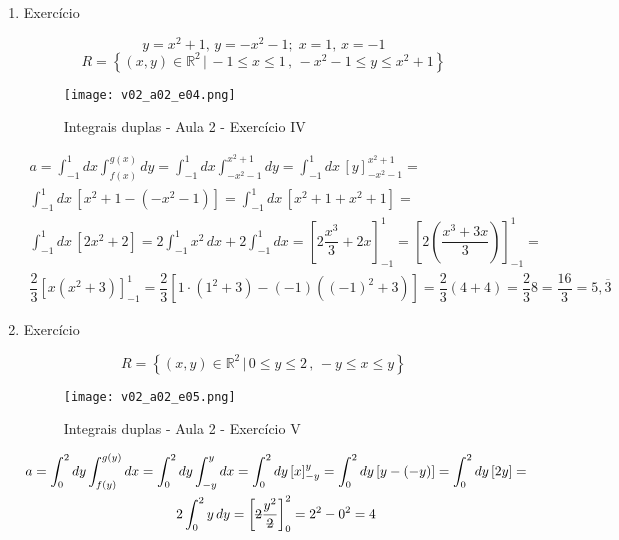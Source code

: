 \begin{enumerate}
	\item Exercício
	
	\begin{equation*}
		y = x^2 + 1 ,\, y = -x^2 - 1 ;\; x = 1 ,\, x = -1
	\end{equation*}
	\begin{equation*}
		R = \left\{(x, y) \in \mathbb{R}^2 \,|\, -1 \leq x \leq 1 \,,\, -x^2 - 1 \leq y \leq x^2 + 1 \right\}
	\end{equation*}	
	\begin{figure}[htb]
		\caption{Integrais duplas - Aula 2 - Exercício IV}
		\label{v02_a02_e04}
		\centering
		\texttt{[image: v02\_a02\_e04.png]}		
	\end{figure}
	
	\begin{gather*}
		a = \int_{-1}^1 dx \int_{f(x)}^{g(x)} dy = \int_{-1}^1 dx \int_{-x^2 - 1}^{x^2 + 1} dy = \int_{-1}^1 dx\, [y]_{-x^2 - 1}^{x^2 + 1} =\\ \int_{-1}^1 dx\, \left[x^2 + 1 - \left(-x^2 - 1\right)\right] = \int_{-1}^1 dx\, \left[x^2 + 1 + x^2 + 1\right] =\\ \int_{-1}^1 dx\, \left[2x^2 + 2\right] = 2\int_{-1}^1 x^2\, dx + 2\int_{-1}^1 dx = \left[2\dfrac{x^3}{3} +  2x\right]_{-1}^1 = \left[2\left(\dfrac{x^3 + 3x}{3}\right)\right]_{-1}^1 =\\ \dfrac{2}{3}\left[x\left(x^2 + 3\right)\right]_{-1}^1 = \dfrac{2}{3}\left[1 \cdot \left(1^2 + 3\right) - (-1)\left((-1)^2 + 3\right)\right] = \dfrac{2}{3}(4 + 4) = \dfrac{2}{3}8 = \dfrac{16}{3} = 5,\overline{3}	
	\end{gather*}
		
	\item Exercício
	
	\begin{equation*}
		R = \left\{(x, y) \in \mathbb{R}^2 \,|\, 0 \leq y \leq 2 \,,\, -y \leq x \leq y \right\}
	\end{equation*}
		
	\begin{figure}[htb]
		\caption{Integrais duplas - Aula 2 - Exercício V}
		\label{v02_a02_e05}
		\centering
		\texttt{[image: v02\_a02\_e05.png]}		
	\end{figure}
	
	\begin{gather*}
		a = \int_0^2 dy \int_{f(y)}^{g(y)} dx = \int_0^2 dy \int_{-y}^y dx = \int_0^2 dy\, [x]_{-y}^y = \int_0^2 dy\, [y - (-y)] = \int_0^2 dy\, [2y] =\\ 2\int_0^2 y\, dy = \left[\overstrike{2}\frac{y^2}{\overstrike{2}}\right]_0^2 = 2^2 - 0^2 = 4
	\end{gather*}
\end{enumerate}